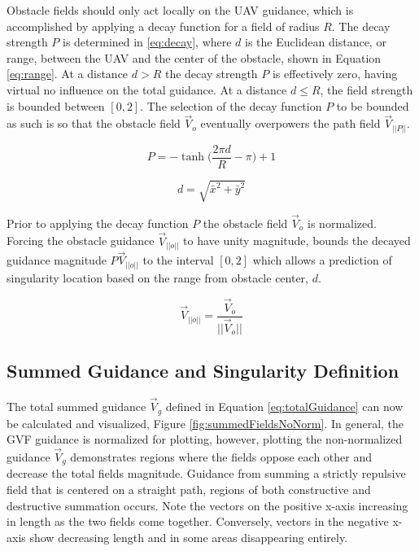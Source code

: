 \documentclass[numbered,pdftex]{ohio-etd}
\begin{document}
Obstacle fields should only act locally on the UAV guidance, which is accomplished by applying a decay function for a field of radius $R$. The decay strength $P$ is determined in \ref{eq:decay}, where $d$ is the Euclidean distance, or range, between the UAV and the center of the obstacle, shown in Equation \ref{eq:range}. At a distance $d>R$ the decay strength $P$ is effectively zero, having virtual no influence on the total guidance. At a distance $d\leq R$, the field strength is bounded between $[0,2]$. The selection of the decay function $P$ to be bounded as such is so that the obstacle field $\overrightarrow{V}_o$ eventually overpowers the path field $\overrightarrow{V}_{||P||}$. 


\begin{equation}
\label{eq:decay}
P = -\tanh \bigg( \frac{2\pi d}{R}-\pi\bigg)+1
\end{equation}

\begin{equation}
\label{eq:range}
d = \sqrt{ \bar{x}^2+\bar{y}^2}
\end{equation}


Prior to applying the decay function $P$ the obstacle field $\overrightarrow{V}_o$ is normalized. Forcing the obstacle guidance $\overrightarrow{V}_{||o||}$ to have unity magnitude, bounds the decayed guidance magnitude $P\overrightarrow{V}_{||o||}$ to the interval $[0,2]$ which allows a prediction of singularity location based on the range from obstacle center, $d$.


\begin{equation}
\overrightarrow{V}_{||o||} = \frac{\overrightarrow{V}_{o}}{||\overrightarrow{V}_{o}||}
\label{eq:obstNormalized}
\end{equation}


\subsection{Summed Guidance and Singularity Definition}
The total summed guidance $\overrightarrow{V}_g$ defined in Equation \ref{eq:totalGuidance} can now be calculated and visualized, Figure \ref{fig:summedFieldsNoNorm}. In general, the GVF guidance is normalized for plotting, however, plotting the non-normalized guidance $\overrightarrow{V}_g$ demonstrates regions where the fields oppose each other and decrease the total fields magnitude. Guidance from summing a strictly repulsive field that is centered on a straight path, regions of both constructive and destructive summation occurs. Note the vectors on the positive x-axis increasing in length as the two fields come together. Conversely, vectors in the negative x-axis show decreasing length and in some areas disappearing entirely.  
\end{document}
